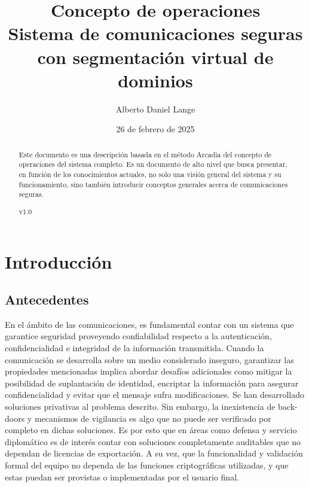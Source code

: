 \documentclass[12pt]{article}
\title{Concepto de operaciones \\
\large Sistema de comunicaciones seguras con segmentación virtual de dominios
}
\author{Alberto Daniel Lange}
\date{26 de febrero de 2025}
\begin{document}
\maketitle
\begin{abstract}
    Este documento es una descripción basada en el método Arcadia del concepto de operaciones del sistema completo. Es un documento de alto nivel que busca presentar, en función de los conocimientos actuales, no solo una visión general del sistema y su funcionamiento, sino también introducir conceptos generales acerca de comunicaciones seguras.

    \begin{center}
        v1.0
    \end{center}
\end{abstract}


\tableofcontents
\newpage

\section{Introducción}
\subsection{Antecedentes}

En el ámbito de las comunicaciones, es fundamental contar con un sistema que garantice seguridad proveyendo confiabilidad respecto a la autenticación, confidencialidad e integridad de la información transmitida. Cuando la comunicación se desarrolla sobre un medio considerado inseguro, garantizar las propiedades mencionadas implica abordar desafíos adicionales como mitigar la posibilidad de suplantación de identidad, encriptar la información para asegurar confidencialidad y evitar que el mensaje sufra modificaciones.
Se han desarrollado soluciones privativas al problema descrito. Sin embargo, la inexistencia de back-doors y mecanismos de vigilancia es algo que no puede ser verificado por completo en dichas soluciones. Es por esto que en áreas como defensa y servicio diplomático es de interés contar con soluciones completamente auditables que no dependan de licencias de exportación. A su vez, que la funcionalidad y validación formal del equipo no dependa de las funciones criptográficas utilizadas, y que estas puedan ser provistas o implementadas por el usuario final.
\end{document}
